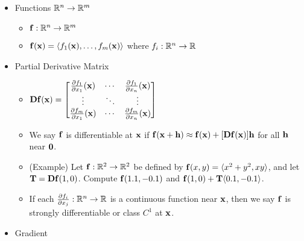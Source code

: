 \documentclass[11pt]{article}
\begin{document}
\begin{itemize}
  \item Functions \(\mathbb R^n\to\mathbb R^m\)
    \begin{itemize}
      \item \(\mathbf{f}:\mathbb R^n\to\mathbb R^m\)
      \item
        \(
          \mathbf{f}(\mathbf{x})
            =
          \langle f_1(\mathbf{x}),\dots,f_m(\mathbf{x})\rangle
        \) where \(f_i:\mathbb R^n\to \mathbb R\)
    \end{itemize}
  \item Partial Derivative Matrix
    \begin{itemize}
      \item
        \(\displaystyle
          \mathbf{D}\mathbf{f}(\mathbf{x})
            =
          \begin{bmatrix}
            \frac{\partial f_1}{\partial x_1}(\mathbf{x}) &
            \cdots &
            \frac{\partial f_1}{\partial x_n}(\mathbf{x})
            \\
            \vdots & \ddots & \vdots
            \\
            \frac{\partial f_m}{\partial x_1}(\mathbf{x}) &
            \cdots &
            \frac{\partial f_m}{\partial x_n}(\mathbf{x})
          \end{bmatrix}
        \)
      \item
        We say \(\mathbf{f}\) is differentiable at \(\mathbf{x}\) if
        \(
          \mathbf{f}(\mathbf{x}+\mathbf{h})
            \approx
          \mathbf{f}(\mathbf{x})+[\mathbf{D}\mathbf{f}(\mathbf{x})]\mathbf{h}
        \)
        for all \(\mathbf{h}\) near \(\mathbf{0}\).
      \item (Example) Let \(\mathbf{f}:\mathbb R^2\to\mathbb R^2\) be defined by
        \(\mathbf{f}(x,y)=\langle x^2+y^2,xy\rangle\), and let
        \(\mathbf{T}=\mathbf{D}\mathbf{f}(1,0)\). Compute
        \(\mathbf{f}(1.1,-0.1)\) and \(\mathbf{f}(1,0)+\mathbf{T}\langle0.1,-0.1\rangle\).
      \item If each \(\frac{\partial f_i}{\partial x_j}:\mathbb R^n\to\mathbb R\)
        is a continuous function near \(\mathbf{x}\), then we say \(\mathbf{f}\)
        is strongly differentiable or class \(C^1\) at \(\mathbf{x}\).
    \end{itemize}
  \item Gradient
\end{itemize}
\end{document}
